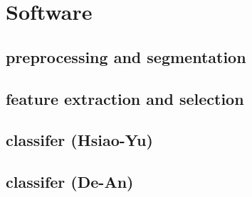 \section{Software}

\subsection{preprocessing and segmentation}



\subsection{feature extraction and selection}



\subsection{classifer (Hsiao-Yu)}


\subsection{classifer (De-An)}




